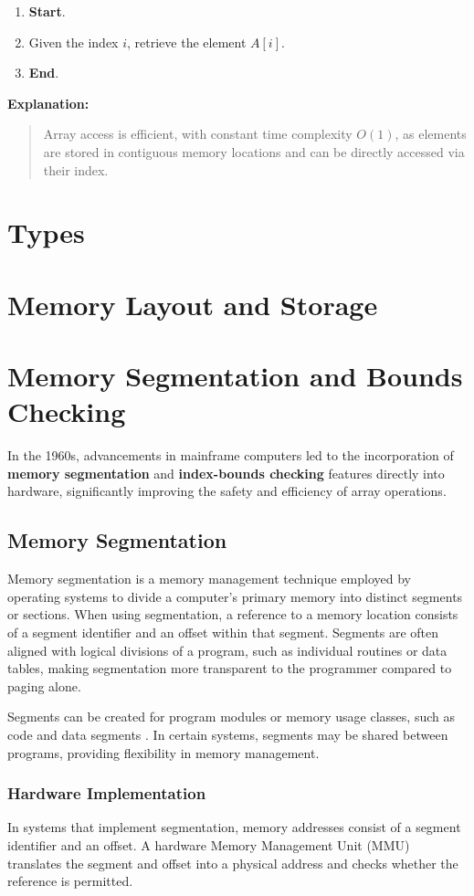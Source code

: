 \documentclass[12pt, oneside]{book}
\begin{document}
\begin{enumerate}
	\item \textbf{Start}.
	\item Given the index $i$, retrieve the element $A[i]$.
	\item \textbf{End}.
\end{enumerate}

\textbf{Explanation:}
\begin{quote}
	Array access is efficient, with constant time complexity $O(1)$, as elements are stored in contiguous memory locations and can be directly accessed via their index.
\end{quote}

\section{Types}
\section{Memory Layout and Storage}
\section{Memory Segmentation and Bounds Checking}

In the 1960s, advancements in mainframe computers led to the incorporation of \textbf{memory segmentation} and \textbf{index-bounds checking} features directly into hardware, significantly improving the safety and efficiency of array operations.

\subsection{Memory Segmentation}
Memory segmentation is a memory management technique employed by operating systems to divide a computer's primary memory into distinct segments or sections. When using segmentation, a reference to a memory location consists of a segment identifier and an offset within that segment. Segments are often aligned with logical divisions of a program, such as individual routines or data tables, making segmentation more transparent to the programmer compared to paging alone. 

Segments can be created for program modules or memory usage classes, such as code and data segments . In certain systems, segments may be shared between programs, providing flexibility in memory management.

\subsubsection{Hardware Implementation}
In systems that implement segmentation, memory addresses consist of a segment identifier and an offset. A hardware Memory Management Unit (MMU) translates the segment and offset into a physical address and checks whether the reference is permitted.
\end{document}
